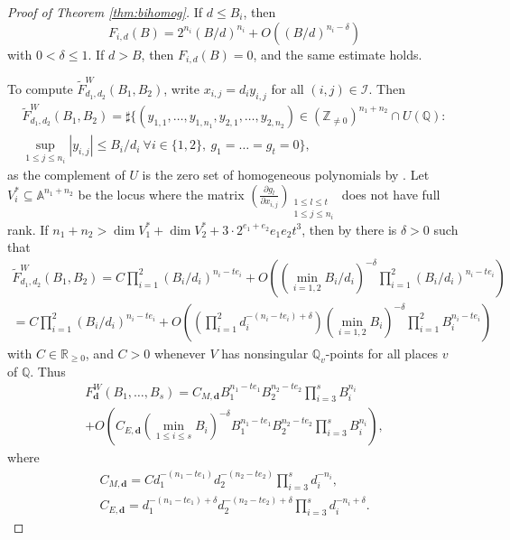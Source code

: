 \documentclass[10pt, a4paper, reqno, english]{amsart}
\newcommand\ZZ{\mathbb{Z}}
\newcommand\RR{\mathbb{R}}
\newcommand\QQ{\mathbb{Q}}
\newcommand{\A}{\mathbb{A}} %
\newcommand{\indexset}{{\mathcal I}} %
\theoremstyle{definition}
\numberwithin{theorem}{section}
\numberwithin{equation}{section}
\begin{document}
\begin{proof}[Proof of Theorem \ref{thm:bihomog}]
	  If $d\leq B_i$, then
	 $$
	 F_{i,d}(B)=2^{n_i}(B/d)^{n_i}+O((B/d)^{n_i-\delta})
	 $$
	 with $0<\delta\leq 1$. If $d>B$, then  $F_{i,d}(B)=0$, and the same estimate holds.
	
	To compute $\widetilde F^W_{d_1,d_2}(B_1,B_2)$, write $x_{i,j}=d_iy_{i,j}$ for all $(i,j)\in\indexset$. Then
	\begin{multline*}
	\widetilde F^W_{d_1,d_2}(B_1,B_2)=\sharp\{(y_{1,1},\dots,y_{1,n_1}, y_{2,1},\dots,y_{2,n_2})\in(\ZZ_{\neq 0})^{n_1+n_2}\cap U(\QQ): \\
	 \sup_{1\leq j\leq n_{i}}|y_{i,j}|\leq B_i/d_i \ \forall i\in\{1,2\}, \ g_1=\dots=g_t=0
	  \},
	 \end{multline*}
	 as the complement of $U$ is the zero set of homogeneous polynomials by \cite[Theorems 4.1, 4.2]{Sch}.
	 Let $V_i^*\subseteq\A^{n_1+n_2}$ be the locus where the matrix $\left(\frac{\partial g_l}{\partial x_{i,j}}\right)_{\substack{1\leq l\leq t\\1\leq j\leq n_i}}$ does not have full rank.
	 If $n_1+n_2>\dim V_1^*+\dim V_2^* + 3\cdot 2^{e_1+e_2}e_1e_2t^3$,  
	 then by \cite[Theorem 4.4]{Sch}  there is $\delta>0$ such that
	 \begin{multline*}
	 \widetilde F^W_{d_1,d_2}(B_1,B_2)
	 =C \prod_{i=1}^2\left(B_i/d_i\right)^{n_i-te_i}+O\left( \left(\min_{i=1,2}B_i/d_i\right)^{-\delta}\prod_{i=1}^2(B_i/d_i)^{n_i-te_i}\right)\\
	 =C \prod_{i=1}^2\left(B_i/d_i\right)^{n_i-te_i}+O\left( \left(\prod_{i=1}^2d_i^{-(n_i-te_i)+\delta}\right)\left(\min_{i=1,2}B_i\right)^{-\delta}\prod_{i=1}^2B_i^{n_i-te_i}\right)
	 \end{multline*}	 
	 with $C\in\RR_{\geq 0}$, and $C>0$ whenever $V$ has nonsingular $\QQ_v$-points for all places $v$ of $\QQ$. 
Thus	 
\begin{multline*}
F^W_{\mathbf d}(B_1,\dots,B_s) = C_{M,\mathbf d} B_1^{n_1-te_1}B_2^{n_2-te_2}\prod_{i=3}^sB_i^{n_i} \\+O\left(C_{E,\mathbf d}\left(\min_{1\leq i\leq s}B_i\right)^{-\delta}B_1^{n_1-te_1}B_2^{n_2-te_2}\prod_{i=3}^sB_i^{n_i}\right),
\end{multline*}
	 where 
	 \begin{gather}
	 \label{eq:bihom C_M}
	 C_{M,\mathbf d}=C d_1^{-(n_1-te_1)}d_2^{-(n_2-te_2)} \prod_{i=3}^sd_i^{-n_i},\\
	 C_{E,\mathbf d}= d_1^{-(n_1-te_1)+\delta}d_2^{-(n_2-te_2)+\delta} \prod_{i=3}^sd_i^{-n_i+\delta}.
	 \end{gather}
	 

\end{proof}
\end{document}

